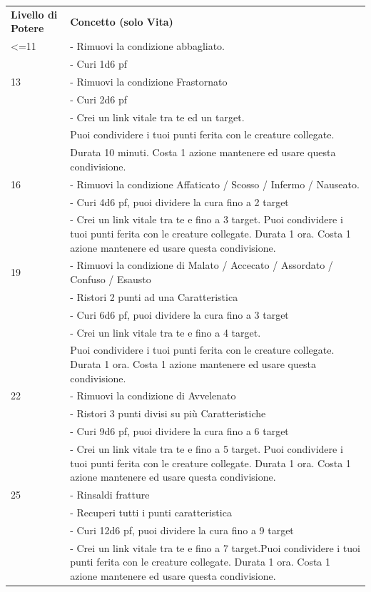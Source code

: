 \documentclass[a4paper,11pt,twoside,openany]{book}
\begin{document}
\begin{longtable}{L{3cm} L{13cm}}
\toprule
\textbf{Livello di Potere} & \textbf{Concetto (solo Vita)}\tabularnewline	
<=11 & - Rimuovi la condizione abbagliato.\\
& - Curi 1d6 pf\\
13 & - Rimuovi la condizione Frastornato\\
& - Curi 2d6 pf\\
& - Crei un link vitale tra te ed un target.\\
& Puoi condividere i tuoi punti ferita con le creature collegate.\\
& Durata 10 minuti. Costa 1 azione mantenere ed usare questa condivisione. \\
16 & - Rimuovi la condizione Affaticato / Scosso / Infermo / Nauseato.\\
& - Curi 4d6 pf, puoi dividere la cura fino a 2 target\\
& - Crei un link vitale tra te e fino a 3 target. Puoi condividere i tuoi punti ferita con le creature collegate. Durata 1 ora. Costa 1 azione mantenere ed usare questa condivisione.\\
19 & - Rimuovi la condizione di Malato / Accecato / Assordato / Confuso / Esausto\\
& - Ristori 2 punti ad una Caratteristica\\
& - Curi 6d6 pf, puoi dividere la cura fino a 3 target\\
& - Crei un link vitale tra te e fino a 4 target.\\
& Puoi condividere i tuoi punti ferita con le creature collegate. Durata 1 ora. Costa 1 azione mantenere ed usare questa condivisione.\\
22 &- Rimuovi la condizione di Avvelenato\\
& - Ristori 3 punti divisi su più Caratteristiche\\
& - Curi 9d6 pf, puoi dividere la cura fino a 6 target\\
&- Crei un link vitale tra te e fino a 5 target. Puoi condividere i tuoi punti ferita con le creature collegate. Durata 1 ora. Costa 1 azione mantenere ed usare questa condivisione.\\
25 & - Rinsaldi fratture\\
& - Recuperi tutti i punti caratteristica\\
& - Curi 12d6 pf, puoi dividere la cura fino a 9 target\\
& - Crei un link vitale tra te e fino a 7 target.Puoi condividere i tuoi punti ferita con le creature collegate. Durata 1 ora. Costa 1 azione mantenere ed usare questa condivisione.\\

\end{longtable}
\end{document}
